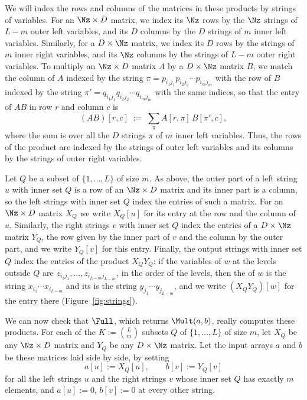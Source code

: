 We will index the rows and columns of the matrices in these products by strings of variables. For an $\Nz\times D$ matrix, we index its $\Nz$ rows by the $\Nz$ strings of $L-m$ outer left variables, and its $D$ columns by the $D$ strings of $m$ inner left variables. Similarly, for a $D\times\Nz$ matrix, we index its $D$ rows by the strings of $m$ inner right variables, and its $\Nz$ columns by the strings of $L-m$ outer right variables. To multiply an $\Nz\times D$ matrix $A$ by a $D\times\Nz$ matrix $B$, we match the column of $A$ indexed by the string $\pi=p_{i_1j_1}p_{i_2j_2}\cdots p_{i_mj_m}$ with the row of $B$ indexed by the string $\pi'=q_{i_1j_1}q_{i_2j_2}\cdots q_{i_mj_m}$ with the same indices, so that the entry of $AB$ in row $r$ and column $c$ is
\[
(AB)[r,c]\;:=\;\sum_{\pi}A[r,\pi]\,B[\pi',c],
\]
where the sum is over all the $D$ strings $\pi$ of $m$ inner left variables. Thus, the rows of the product are indexed by the strings of outer left variables and its columns by the strings of outer right variables.

Let $Q$ be a subset of $\{1,\dots,L\}$ of size $m$. As above, the outer part of a left string $u$ with inner set $Q$ is a row of an $\Nz\times D$ matrix and its inner part is a column, so the left strings with inner set $Q$ index the entries of such a matrix. For an $\Nz\times D$ matrix $X_Q$ we write $X_Q[u]$ for its entry at the row and the column of $u$. Similarly, the right strings $v$ with inner set $Q$ index the entries of a $D\times\Nz$ matrix $Y_Q$, the row given by the inner part of $v$ and the column by the outer part, and we write $Y_Q[v]$ for this entry. Finally, the output strings with inner set $Q$ index the entries of the product $X_QY_Q$: if the variables of $w$ at the levels outside $Q$ are $z_{i_1j_1},\dots,z_{i_{L-m}j_{L-m}}$, in the order of the levels, then the  of $w$ is the string $x_{i_1}\cdots x_{i_{L-m}}$ and its  is the string $y_{j_1}\cdots y_{j_{L-m}}$, and we write $(X_QY_Q)[w]$ for the entry there (Figure~\ref{fig:strings}).

We can now check that $\Full$, which returns $\Mult(a,b)$, really computes these products. For each of the $K:=\binom Lm$ subsets $Q$ of $\{1,\dots,L\}$ of size $m$, let $X_Q$ be any $\Nz\times D$ matrix and $Y_Q$ be any $D\times\Nz$ matrix. Let the input arrays $a$ and $b$ be these matrices laid side by side, by setting
\[
a[u]:=X_Q[u],\qquad b[v]:=Y_Q[v]
\]
for all the left strings $u$ and the right strings $v$ whose inner set $Q$ has exactly $m$ elements, and $a[u]:=0$, $b[v]:=0$ at every other string.

